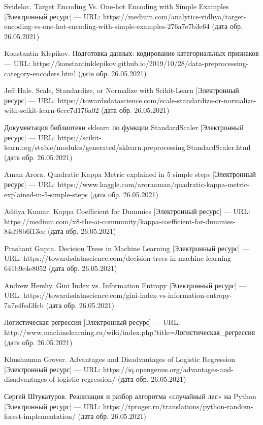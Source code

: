 \documentclass[14pt]{mmcs_article}
\begin{document}
\begin{thebibliography}{0}
Svideloc. Target Encoding Vs. One-hot Encoding with Simple Examples  [Электронный ресурс] --- URL:  https://medium.com/analytics-vidhya/target-encoding-vs-one-hot-encoding-with-simple-examples-276a7e7b3e64 (дата обр. 26.05.2021)

Konstantin Klepikov. Подготовка данных: кодирование категориальных признаков --- URL: https://konstantinklepikov.github.io/2019/10/28/data-preprocessing-category-encoders.html (дата обр. 26.05.2021)

Jeff Hale. Scale, Standardize, or Normalize with Scikit-Learn [Электронный ресурс] --- URL:  https://towardsdatascience.com/scale-standardize-or-normalize-with-scikit-learn-6ccc7d176a02 (дата обр. 26.05.2021)

Документация библиотеки sklearn по функции StandardScaler  [Электронный ресурс] --- URL:  https://scikit-learn.org/stable/modules/generated/sklearn.preprocessing.StandardScaler.html (дата обр. 26.05.2021)

Aman Arora. Quadratic Kappa Metric explained in 5 simple steps  [Электронный ресурс] --- URL:  https://www.kaggle.com/aroraaman/quadratic-kappa-metric-explained-in-5-simple-steps (дата обр. 26.05.2021)

Aditya Kumar. Kappa Coefficient for Dummies [Электронный ресурс] --- URL:  https://medium.com/x8-the-ai-community/kappa-coefficient-for-dummies-84d98b6f13ee (дата обр. 26.05.2021)

Prashant Gupta. Decision Trees in Machine Learning [Электронный ресурс] --- URL:  https://towardsdatascience.com/decision-trees-in-machine-learning-641b9c4e8052 (дата обр. 26.05.2021)

Andrew Hershy. Gini Index vs. Information Entropy [Электронный ресурс] --- URL: https://towardsdatascience.com/gini-index-vs-information-entropy-7a7e4fed3fcb (дата обр. 26.05.2021)

Логистическая регрессия [Электронный ресурс] --- URL:  http://www.machinelearning.ru/wiki/index.php?title=Логистическая\_регрессия (дата обр. 26.05.2021)

Khushnuma Grover. Advantages and Disadvantages of Logistic Regression [Электронный ресурс] --- URL:  https://iq.opengenus.org/advantages-and-disadvantages-of-logistic-regression/ (дата обр. 26.05.2021)

Сергей Штукатуров. Реализация и разбор алгоритма «случайный лес» на Python [Электронный ресурс] --- URL: https://tproger.ru/translations/python-random-forest-implementation/ (дата обр. 26.05.2021)


\end{thebibliography}
\end{document}
